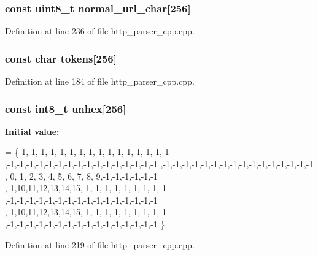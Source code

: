 \subsubsection[{normal\+\_\+url\+\_\+char}]{\setlength{\rightskip}{0pt plus 5cm}const uint8\+\_\+t normal\+\_\+url\+\_\+char[256]\hspace{0.3cm}{\ttfamily [static]}}\label{http__parser__cpp_8cpp_ab9e25c10b444cd551b4ad019892abc0b}


Definition at line 236 of file http\+\_\+parser\+\_\+cpp.\+cpp.

\subsubsection[{tokens}]{\setlength{\rightskip}{0pt plus 5cm}const char tokens[256]\hspace{0.3cm}{\ttfamily [static]}}\label{http__parser__cpp_8cpp_a4e5747065ed2d7b90f2d8a148c88b55b}


Definition at line 184 of file http\+\_\+parser\+\_\+cpp.\+cpp.

\subsubsection[{unhex}]{\setlength{\rightskip}{0pt plus 5cm}const int8\+\_\+t unhex[256]\hspace{0.3cm}{\ttfamily [static]}}\label{http__parser__cpp_8cpp_a50ac0fd18703512ac28f2da3a65a84b6}
{\bfseries Initial value\+:}
\begin{DoxyCode}
=
  \{-1,-1,-1,-1,-1,-1,-1,-1,-1,-1,-1,-1,-1,-1,-1,-1
  ,-1,-1,-1,-1,-1,-1,-1,-1,-1,-1,-1,-1,-1,-1,-1,-1
  ,-1,-1,-1,-1,-1,-1,-1,-1,-1,-1,-1,-1,-1,-1,-1,-1
  , 0, 1, 2, 3, 4, 5, 6, 7, 8, 9,-1,-1,-1,-1,-1,-1
  ,-1,10,11,12,13,14,15,-1,-1,-1,-1,-1,-1,-1,-1,-1
  ,-1,-1,-1,-1,-1,-1,-1,-1,-1,-1,-1,-1,-1,-1,-1,-1
  ,-1,10,11,12,13,14,15,-1,-1,-1,-1,-1,-1,-1,-1,-1
  ,-1,-1,-1,-1,-1,-1,-1,-1,-1,-1,-1,-1,-1,-1,-1,-1
  \}
\end{DoxyCode}


Definition at line 219 of file http\+\_\+parser\+\_\+cpp.\+cpp.

